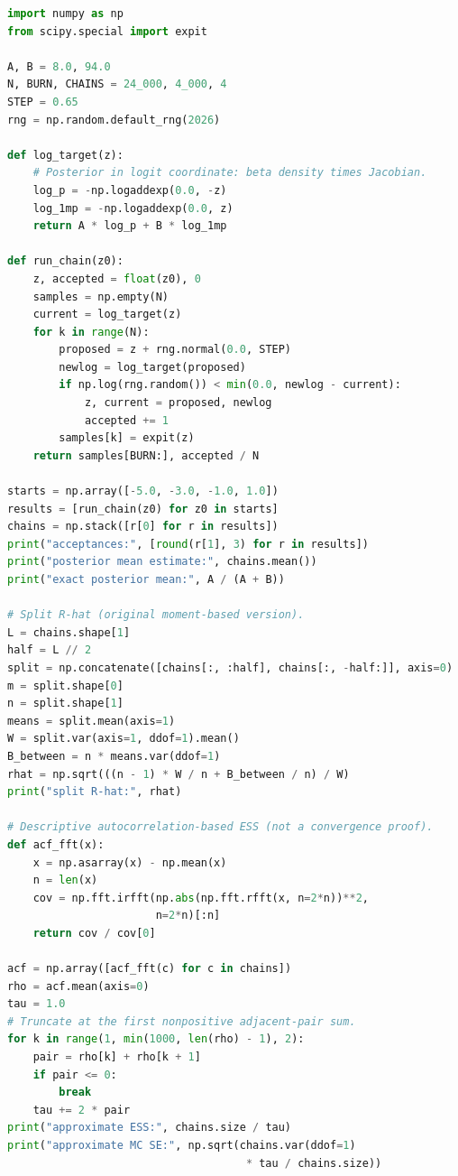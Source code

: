 \documentclass[11pt,a4paper,oneside]{report}
\numberwithin{equation}{chapter}
\theoremstyle{plain}
\theoremstyle{definition}
\theoremstyle{remark}
\begin{document}
\begin{lstlisting}[language=Python,caption={Kompletny program: cztery łańcuchy Metropolisa--Hastingsa dla posterioru beta, split-R-hat i przybliżony ESS (Python, NumPy i SciPy).}]
import numpy as np
from scipy.special import expit

A, B = 8.0, 94.0
N, BURN, CHAINS = 24_000, 4_000, 4
STEP = 0.65
rng = np.random.default_rng(2026)

def log_target(z):
    # Posterior in logit coordinate: beta density times Jacobian.
    log_p = -np.logaddexp(0.0, -z)
    log_1mp = -np.logaddexp(0.0, z)
    return A * log_p + B * log_1mp

def run_chain(z0):
    z, accepted = float(z0), 0
    samples = np.empty(N)
    current = log_target(z)
    for k in range(N):
        proposed = z + rng.normal(0.0, STEP)
        newlog = log_target(proposed)
        if np.log(rng.random()) < min(0.0, newlog - current):
            z, current = proposed, newlog
            accepted += 1
        samples[k] = expit(z)
    return samples[BURN:], accepted / N

starts = np.array([-5.0, -3.0, -1.0, 1.0])
results = [run_chain(z0) for z0 in starts]
chains = np.stack([r[0] for r in results])
print("acceptances:", [round(r[1], 3) for r in results])
print("posterior mean estimate:", chains.mean())
print("exact posterior mean:", A / (A + B))

# Split R-hat (original moment-based version).
L = chains.shape[1]
half = L // 2
split = np.concatenate([chains[:, :half], chains[:, -half:]], axis=0)
m = split.shape[0]
n = split.shape[1]
means = split.mean(axis=1)
W = split.var(axis=1, ddof=1).mean()
B_between = n * means.var(ddof=1)
rhat = np.sqrt(((n - 1) * W / n + B_between / n) / W)
print("split R-hat:", rhat)

# Descriptive autocorrelation-based ESS (not a convergence proof).
def acf_fft(x):
    x = np.asarray(x) - np.mean(x)
    n = len(x)
    cov = np.fft.irfft(np.abs(np.fft.rfft(x, n=2*n))**2,
                       n=2*n)[:n]
    return cov / cov[0]

acf = np.array([acf_fft(c) for c in chains])
rho = acf.mean(axis=0)
tau = 1.0
# Truncate at the first nonpositive adjacent-pair sum.
for k in range(1, min(1000, len(rho) - 1), 2):
    pair = rho[k] + rho[k + 1]
    if pair <= 0:
        break
    tau += 2 * pair
print("approximate ESS:", chains.size / tau)
print("approximate MC SE:", np.sqrt(chains.var(ddof=1)
                                     * tau / chains.size))
\end{lstlisting}
\end{document}
